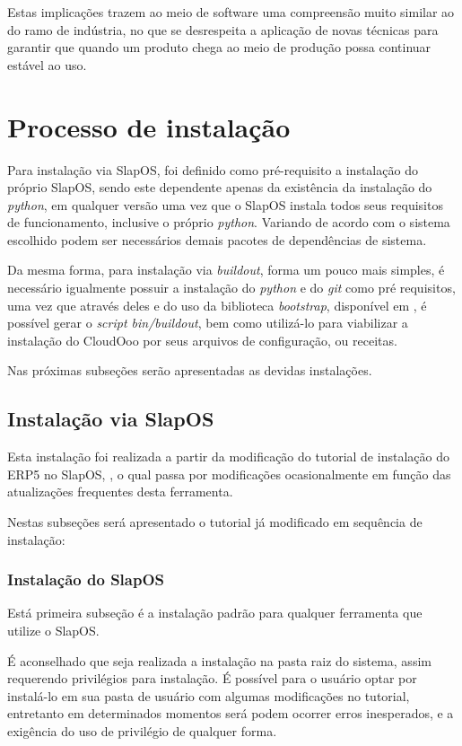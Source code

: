 Estas implicações trazem ao meio de software uma compreensão muito similar ao do ramo de indústria, no que se desrespeita a aplicação de novas técnicas para garantir que quando um produto chega ao meio de produção possa continuar estável ao uso.


\section{Processo de instalação}

Para instalação via SlapOS, foi definido como pré-requisito a instalação do próprio SlapOS, sendo este dependente apenas da existência da instalação do \textit{python}, em qualquer versão uma vez que o SlapOS instala todos seus requisitos de funcionamento, inclusive o próprio \textit{python}. Variando de acordo com o sistema escolhido podem ser necessários demais pacotes de dependências de sistema.

Da mesma forma, para instalação via \textit{buildout}, forma um pouco mais simples, é necessário igualmente possuir a instalação do  \textit{python} e do \textit{git} como pré requisitos, uma vez que através deles e do uso da biblioteca \textit{bootstrap}, disponível em \cite{BOOTSTRAP}, é possível gerar o \textit{script bin/buildout}, bem como utilizá-lo para viabilizar a instalação do CloudOoo por seus arquivos de configuração, ou receitas.

Nas próximas subseções serão apresentadas as devidas instalações.


\subsection{Instalação via SlapOS}

Esta instalação foi realizada a partir da modificação do tutorial de instalação do ERP5 no SlapOS, \cite{ERP5-SLAPOS}, o qual passa por modificações ocasionalmente em função das atualizações frequentes desta ferramenta.

Nestas subseções será apresentado o tutorial já modificado em sequência de instalação:


\subsubsection{Instalação do SlapOS}
\label{insslapos}

Está primeira subseção é a instalação padrão para qualquer ferramenta que utilize o SlapOS.

É aconselhado que seja realizada a instalação na pasta raiz do sistema, assim requerendo privilégios para instalação. É possível para o usuário optar por instalá-lo em sua pasta de usuário com algumas modificações no tutorial, entretanto em determinados momentos será podem ocorrer erros inesperados, e a exigência do uso de privilégio de qualquer forma.

